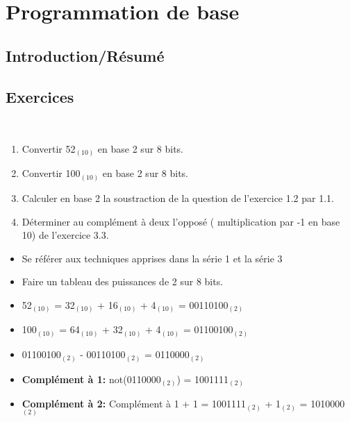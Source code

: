 \section{Programmation de base}

\subsection{Introduction/Résumé}

\subsection{Exercices}

\begin{Exercice}[Durée 5]\\
    \begin{enumerate}
        \item Convertir 52$_{(10)}$ en base 2 sur 8 bits.
        \item Convertir 100$_{(10)}$ en base 2 sur 8 bits.
        \item Calculer en base 2 la soustraction de la question de l'exercice 1.2 par 1.1.
        \item Déterminer au complément à deux l'opposé ( multiplication par -1 en base 10) de l'exercice 3.3.
    \end{enumerate}
\begin{conseil}
   \begin{itemize}
       \item Se référer aux techniques apprises dans la série 1 et la série 3
       \item Faire un tableau des puissances de 2 sur 8 bits.
   \end{itemize}
\end{conseil}
    
\begin{solution}
\begin{itemize}
    \item 52$_{(10)}$ = 32$_{(10)}$ + 16$_{(10)}$ + 4$_{(10)}$ = 00110100$_{(2)}$
    \item 100$_{(10)}$ = 64$_{(10)}$ + 32$_{(10)}$ + 4$_{(10)}$ = 01100100$_{(2)}$
    \item 01100100$_{(2)}$ - 00110100$_{(2)}$ = 0110000$_{(2)}$
    \item \textbf{Complément à 1:} not(0110000$_{(2)}$) = 1001111$_{(2)}$ 
    \item \textbf{Complément à 2:} Complément à 1 + 1 = 1001111$_{(2)}$ + 1$_{(2)}$ = 1010000$_{(2)}$
\end{itemize}   
\end{solution}

\end{Exercice}



